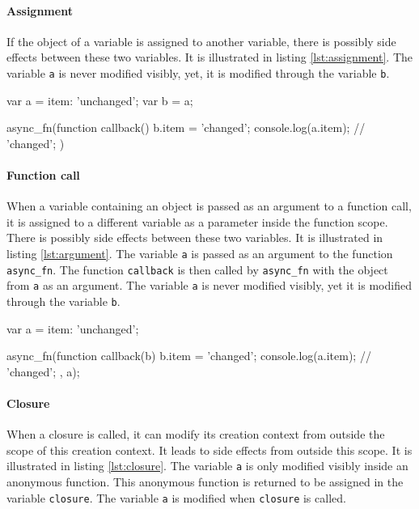 \paragraph{Assignment}

If the object of a variable is assigned to another variable, there is possibly side effects between these two variables.
It is illustrated in listing \ref{lst:assignment}.
The variable \texttt{a} is never modified visibly, yet, it is modified through the variable \texttt{b}.

\begin{code}[js, caption={Example of a scope leak due to assignment},label={lst:assignment}]
var a = {item: 'unchanged'};
var b = a;

async_fn(function callback() {
  b.item = 'changed';
  console.log(a.item); // 'changed';
})
\end{code}

\paragraph{Function call}

When a variable containing an object is passed as an argument to a function call, it is assigned to a different variable as a parameter inside the function scope.
There is possibly side effects between these two variables.
It is illustrated in listing \ref{lst:argument}.
The variable \texttt{a} is passed as an argument to the function \texttt{async\_fn}.
The function \texttt{callback} is then called by \texttt{async\_fn} with the object from \texttt{a} as an argument.
The variable \texttt{a} is never modified visibly, yet it is modified through the variable \texttt{b}.

\begin{code}[js, caption={Example of a scope leak due to a function call},label={lst:argument}]
var a = {item: 'unchanged'};

async_fn(function callback(b) {
  b.item = 'changed';
  console.log(a.item); // 'changed';
}, a);
\end{code}

\paragraph{Closure}

When a closure is called, it can modify its creation context from outside the scope of this creation context.
It leads to side effects from outside this scope.
It is illustrated in listing \ref{lst:closure}.
The variable \texttt{a} is only modified visibly inside an anonymous function.
This anonymous function is returned to be assigned in the variable \texttt{closure}.
The variable \texttt{a} is modified when \texttt{closure} is called.

